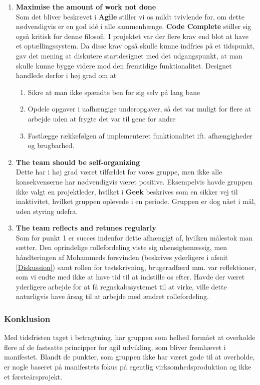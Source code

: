 \documentclass[]{article}
\begin{document}
\begin{enumerate}
    \item \textbf{Maximise the amount of work not done} \\
Som det bliver beskrevet i \textbf{Agile} \cite{martin2006agile} stiller vi os mildt tvivlende for, om dette nødvendigvis er en god idé i alle sammenhænge. \textbf{Code Complete} \cite{mcconnell2004code} stiller sig også kritisk for denne filosofi. I projektet var der flere krav end blot at have et optællingssystem. Da disse krav også skulle kunne indfries på et tidspunkt, gav det mening at diskutere startdesignet med det udgangspunkt, at man skulle kunne bygge videre mod den fremtidige funktionalitet. Designet handlede derfor i høj grad om at
    \begin{enumerate}
        \item Sikre at man ikke spændte ben for sig selv på lang bane
        \item Opdele opgaver i uafhængige underopgaver, så det var muligt for flere at arbejde uden at frygte det var til gene for andre
        \item Fastlægge rækkefølgen af implementeret funktionalitet ift. afhængigheder og brugbarhed.
    \end{enumerate}
    
    \item \textbf{The team should be self-organizing} \\
Dette har i høj grad været tilfældet for vores gruppe, men ikke alle konsekvenserne har nødvendigvis været positive. Eksempelvis havde gruppen ikke valgt en projektleder, hvilket i \textbf{Geek} \cite{fitzpatrick2012team} beskrives som en sikker vej til inaktivitet, hvilket gruppen oplevede i en periode. Gruppen er dog nået i mål, uden styring udefra. 

    \item \textbf{The team reflects and retunes regularly} \\
Som for punkt 1 er succes indenfor dette afhængigt af, hvilken målestok man sætter. Den oprindelige rollefordeling viste sig uhensigtsmæssig, men håndteringen af Mohammeds forsvinden (beskrives yderligere i afsnit \ref{Diskussion}) samt rollen for testskrivning, brugeradfærd mm. var reflektioner, som vi endte med ikke at have tid til at indstille os efter. Havde der været yderligere arbejde for at få regnskabssystemet til at virke, ville dette naturligvis have årsag til at arbejde med ændret rollefordeling.
\end{enumerate}

\subsubsection*{Konklusion}
\noindent Med tidsfristen taget i betragtning, har gruppen som helhed formået at overholde flere af de fastsatte principper for agil udvikling, som bliver fremhævet i manifestet. Blandt de punkter, som gruppen ikke har været gode til at overholde, er nogle baseret på manifestets fokus på egentlig virksomhedsproduktion og ikke et førsteårsprojekt.
\end{document}

